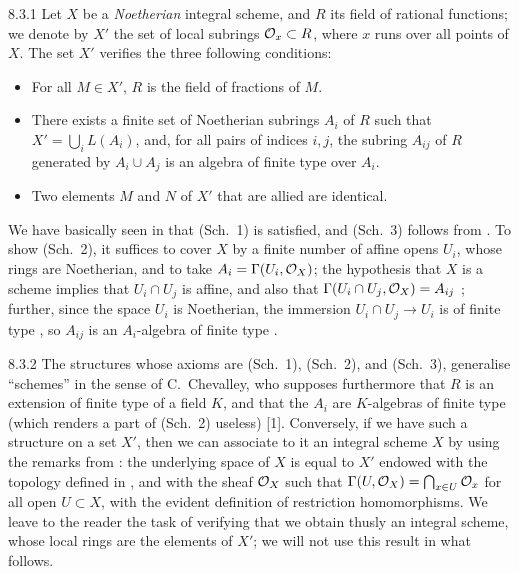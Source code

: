 \documentclass[../main.tex]{subfiles}
\begin{document}
\begin{env}{8.3.1}
Let $X$ be a \emph{Noetherian} integral scheme, and $R$ its
field of rational functions; we denote by $X'$ the set of local subrings
$\mathcal{O}_x\subset R$, where $x$ runs over all points of $X$. The set $X'$ verifies
the three following conditions:
\begin{itemize}
  \item[(Sch. 1)] For all $M\in X'$, $R$ is the field of fractions of $M$.
  \item[(Sch. 2)] There exists a finite set of Noetherian subrings $A_i$ of $R$
  such that $X'=\bigcup_i L(A_i)$, and, for all pairs of indices $i,j$, the subring
  $A_{ij}$ of $R$ generated by $A_i\cup A_j$ is an algebra of finite type over $A_i$.
  \item[(Sch. 3)] Two elements $M$ and $N$ of $X'$ that are allied are identical.
\end{itemize}
\end{env}

We have basically seen in  that (Sch.~1) is satisfied, and (Sch.~3)
follows from . To show (Sch.~2), it suffices to cover $X$ by a
finite number of affine opens $U_i$, whose rings are Noetherian, and to take
$A_i=\Gamma(U_i,\mathcal{O}_X)$; the hypothesis that $X$ is a scheme implies that
$U_i\cap U_j$ is affine, and also that $\Gamma(U_i\cap U_j,\mathcal{O}_X)=A_{ij}$
; further, since the space $U_i$ is Noetherian, the immersion
$U_i\cap U_j\to U_i$ is of finite type , so $A_{ij}$ is an
$A_i$-algebra of finite type .

\begin{env}{8.3.2} The structures whose axioms are (Sch.~1), (Sch.~2), and
(Sch.~3), generalise ``schemes'' in the sense of C.~Chevalley, who supposes
furthermore that $R$ is an extension of finite type of a field $K$, and that the
$A_i$ are $K$-algebras of finite type (which renders a part of (Sch.~2) useless)
[1]. Conversely, if we have such a structure on a set $X'$, then we can
associate to it an integral scheme $X$ by using the remarks from :
the underlying space of $X$ is equal to $X'$ endowed with the topology defined
in , and with the sheaf $\mathcal{O}_X$ such that
$\Gamma(U,\mathcal{O}_X)=\bigcap_{x\in U}\mathcal{O}_x$ for all open $U\subset X$, with the
evident definition of restriction homomorphisms. We leave to the reader the
task of verifying that we obtain thusly an integral scheme, whose local rings
are the elements of $X'$; we will not use this result in what follows.
\end{env}
\end{document}
